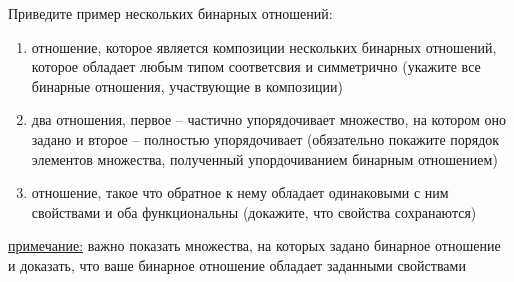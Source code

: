 \question
Приведите  пример  нескольких бинарных отношений:
\begin{enumerate}
	\renewcommand{\labelenumi}{\alph{enumi})}
	\item отношение, которое является композиции нескольких бинарных отношений,  которое  обладает любым типом соответсвия  и симметрично (укажите все бинарные отношения, участвующие в композиции)
	\item два отношения, первое -- частично упорядочивает множество, на котором оно задано и второе -- полностью упорядочивает (обязательно покажите порядок элементов множества, полученный упордочиванием бинарным отношением)
	\item отношение, такое что обратное к нему  обладает одинаковыми с ним свойствами и оба функциональны (докажите, что свойства сохранаются)
\end{enumerate}

\underline{примечание:} важно показать  множества, на которых задано бинарное отношение и доказать, что ваше бинарное отношение обладает заданными свойствами
